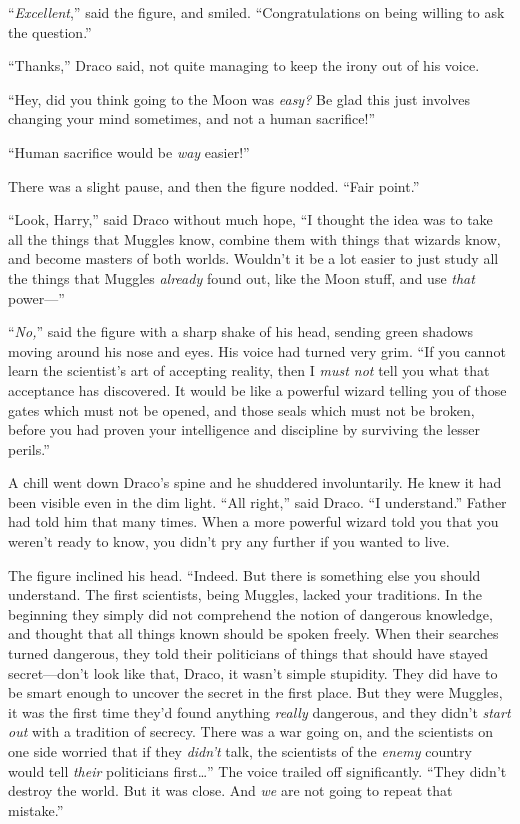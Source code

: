 “\emph{Excellent},” said the figure, and smiled. “Congratulations on being willing to ask the question.”

“Thanks,” Draco said, not quite managing to keep the irony out of his voice.

“Hey, did you think going to the Moon was \emph{easy?} Be glad this just involves changing your mind sometimes, and not a human sacrifice!”

“Human sacrifice would be \emph{way} easier!”

There was a slight pause, and then the figure nodded. “Fair point.”

“Look, Harry,” said Draco without much hope, “I thought the idea was to take all the things that Muggles know, combine them with things that wizards know, and become masters of both worlds. Wouldn’t it be a lot easier to just study all the things that Muggles \emph{already} found out, like the Moon stuff, and use \emph{that} power—”

“\emph{No,}” said the figure with a sharp shake of his head, sending green shadows moving around his nose and eyes. His voice had turned very grim. “If you cannot learn the scientist’s art of accepting reality, then I \emph{must not} tell you what that acceptance has discovered. It would be like a powerful wizard telling you of those gates which must not be opened, and those seals which must not be broken, before you had proven your intelligence and discipline by surviving the lesser perils.”

A chill went down Draco’s spine and he shuddered involuntarily. He knew it had been visible even in the dim light. “All right,” said Draco. “I understand.” Father had told him that many times. When a more powerful wizard told you that you weren’t ready to know, you didn’t pry any further if you wanted to live.

The figure inclined his head. “Indeed. But there is something else you should understand. The first scientists, being Muggles, lacked your traditions. In the beginning they simply did not comprehend the notion of dangerous knowledge, and thought that all things known should be spoken freely. When their searches turned dangerous, they told their politicians of things that should have stayed secret—don’t look like that, Draco, it wasn’t simple stupidity. They did have to be smart enough to uncover the secret in the first place. But they were Muggles, it was the first time they’d found anything \emph{really} dangerous, and they didn’t \emph{start out} with a tradition of secrecy. There was a war going on, and the scientists on one side worried that if they \emph{didn’t} talk, the scientists of the \emph{enemy} country would tell \emph{their} politicians first…” The voice trailed off significantly. “They didn’t destroy the world. But it was close. And \emph{we} are not going to repeat that mistake.”

